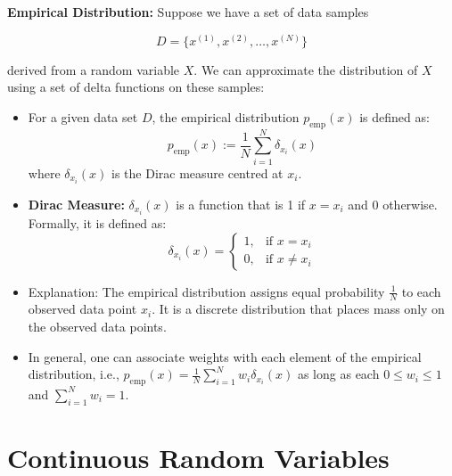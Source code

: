 

\textbf{Empirical Distribution:} Suppose we have a set of data samples 

$$D = \{x^{(1)}, x^{(2)}, \ldots, x^{(N)}\} $$

derived from a random variable \(X\). We can approximate the distribution of \(X\) using a set of delta functions on these samples:
\begin{itemize}
    \item For a given data set \(D\), the empirical distribution \(p_{\text{emp}}(x)\) is defined as:
    \[
    p_{\text{emp}}(x) := \frac{1}{N} \sum_{i=1}^N \delta_{x_i}(x)
    \]
    where \(\delta_{x_i}(x)\) is the Dirac measure centred at \(x_i\).
    \item \textbf{Dirac Measure:} \(\delta_{x_i}(x)\) is a function that is 1 if \(x = x_i\) and 0 otherwise. Formally, it is defined as:
    \[
    \delta_{x_i}(x) = \begin{cases} 
    1, & \text{if } x = x_i \\
    0, & \text{if } x \neq x_i 
    \end{cases}
    \]
    \item Explanation: The empirical distribution assigns equal probability \( \frac{1}{N} \) to each observed data point \(x_i\). It is a discrete distribution that places mass only on the observed data points.
    \item In general, one can associate weights with each element of the empirical distribution, i.e., \(p_{\text{emp}}(x) = \frac{1}{N} \sum_{i=1}^N w_i \delta_{x_i}(x)\) as long as each \( 0 \leq w_i \leq 1 \) and \( \sum_{i=1}^N w_i = 1 \).
\end{itemize}

\section{Continuous Random Variables}

